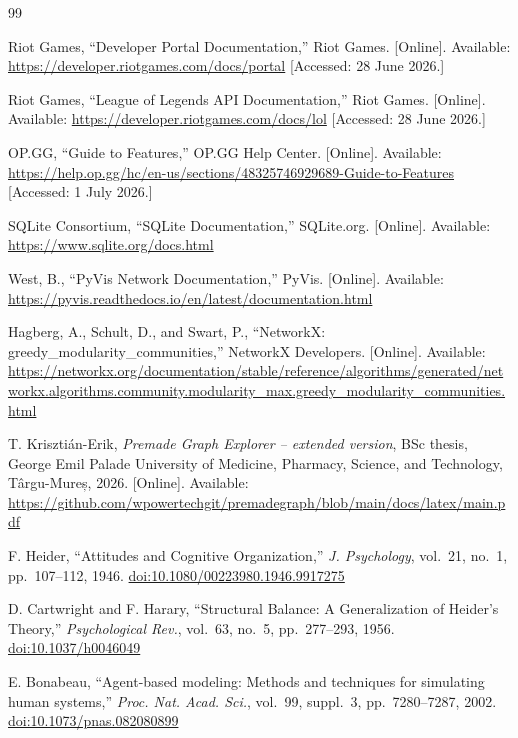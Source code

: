 \begin{thebibliography}{99}

Riot Games, ``Developer Portal Documentation,'' Riot Games. [Online]. Available:
\url{https://developer.riotgames.com/docs/portal}
[Accessed: 28 June 2026.]

Riot Games, ``League of Legends API Documentation,'' Riot Games. [Online]. Available:
\url{https://developer.riotgames.com/docs/lol}
[Accessed: 28 June 2026.]

OP.GG, ``Guide to Features,'' OP.GG Help Center. [Online]. Available:
\url{https://help.op.gg/hc/en-us/sections/48325746929689-Guide-to-Features}
[Accessed: 1 July 2026.]

SQLite Consortium, ``SQLite Documentation,'' SQLite.org. [Online]. Available:
\url{https://www.sqlite.org/docs.html}

West, B., ``PyVis Network Documentation,'' PyVis. [Online]. Available:
\url{https://pyvis.readthedocs.io/en/latest/documentation.html}

Hagberg, A., Schult, D., and Swart, P., ``NetworkX: greedy\_modularity\_communities,''
NetworkX Developers. [Online]. Available:
\url{https://networkx.org/documentation/stable/reference/algorithms/generated/networkx.algorithms.community.modularity_max.greedy_modularity_communities.html}

T. Krisztián-Erik, \textit{Premade Graph Explorer -- extended version}, BSc thesis,
George Emil Palade University of Medicine, Pharmacy, Science, and Technology,
Târgu-Mureș, 2026. [Online]. Available:
\url{https://github.com/wpowertechgit/premadegraph/blob/main/docs/latex/main.pdf}

F. Heider, ``Attitudes and Cognitive Organization,''
\textit{J. Psychology}, vol.~21, no.~1, pp.~107--112, 1946.
\href{https://doi.org/10.1080/00223980.1946.9917275}{doi:10.1080/00223980.1946.9917275}

D. Cartwright and F. Harary, ``Structural Balance: A Generalization of Heider's Theory,''
\textit{Psychological Rev.}, vol.~63, no.~5, pp.~277--293, 1956.
\href{https://doi.org/10.1037/h0046049}{doi:10.1037/h0046049}

E. Bonabeau, ``Agent-based modeling: Methods and techniques for simulating human systems,''
\textit{Proc. Nat. Acad. Sci.}, vol.~99, suppl.~3, pp.~7280--7287, 2002.
\href{https://doi.org/10.1073/pnas.082080899}{doi:10.1073/pnas.082080899}


\end{thebibliography}
